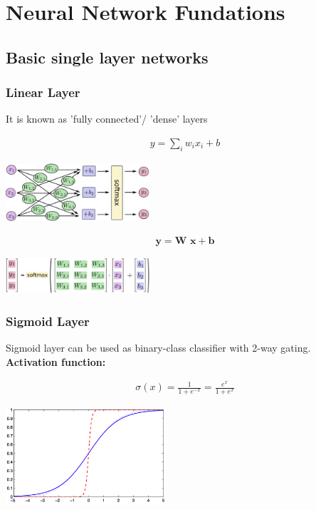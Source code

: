 \chapter{Neural Network Fundations}
\section{Basic single layer networks}

\subsection{Linear Layer}
It is known as 'fully connected'/ 'dense' layers

\begin{align}
	y=\sum_{i}w_ix_i+b
\end{align}

	\includegraphics[width=0.4\textwidth]{figures/linear01}

\begin{align}
	\textbf{y}= \textbf{W x} + \textbf{b}
\end{align}	


	\includegraphics[width=0.4\textwidth]{figures/linear02}
	



\subsection{Sigmoid Layer}
Sigmoid layer can be used as binary-class classifier with 2-way gating.\\
\textbf{Activation function:}

\begin{align}
	\sigma(x)=\frac{1}{1+ e^{-x}} = \frac{e^x}{1+e^{x}}
\end{align}

\begin{center}
	\includegraphics[width=0.45\textwidth]{figures/Sigmoid}
\end{center}



